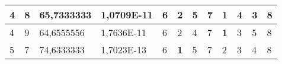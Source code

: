\documentclass[conference]{IEEEtran}
\begin{document}
\begin{table*}[]
\begin{tabular}{|llll|llllllll|}
\multicolumn{1}{|l|}{4}                                                     & \multicolumn{1}{l|}{8}                                                        & \multicolumn{1}{l|}{65,7333333}                                                   & 1,0709E-11                     & \multicolumn{1}{l|}{6}                                                  & \multicolumn{1}{l|}{2}                                                  & \multicolumn{1}{l|}{5}                                                  & \multicolumn{1}{l|}{7}                                                  & \multicolumn{1}{l|}{\textbf{1}}                                         & \multicolumn{1}{l|}{4}                                                  & \multicolumn{1}{l|}{3}                                                  & 8                          \\ \hline
\multicolumn{1}{|l|}{4}                                                     & \multicolumn{1}{l|}{9}                                                        & \multicolumn{1}{l|}{64,6555556}                                                   & 1,7636E-11                     & \multicolumn{1}{l|}{6}                                                  & \multicolumn{1}{l|}{2}                                                  & \multicolumn{1}{l|}{4}                                                  & \multicolumn{1}{l|}{7}                                                  & \multicolumn{1}{l|}{\textbf{1}}                                         & \multicolumn{1}{l|}{3}                                                  & \multicolumn{1}{l|}{5}                                                  & 8                          \\ \hline
\multicolumn{1}{|l|}{5}                                                     & \multicolumn{1}{l|}{7}                                                        & \multicolumn{1}{l|}{74,6333333}                                                   & 1,7023E-13                     & \multicolumn{1}{l|}{6}                                                  & \multicolumn{1}{l|}{\textbf{1}}                                         & \multicolumn{1}{l|}{5}                                                  & \multicolumn{1}{l|}{7}                                                  & \multicolumn{1}{l|}{2}                                                  & \multicolumn{1}{l|}{3}                                                  & \multicolumn{1}{l|}{4}                                                  & 8                          \\ \hline

\end{tabular}
\end{table*}
\end{document}
